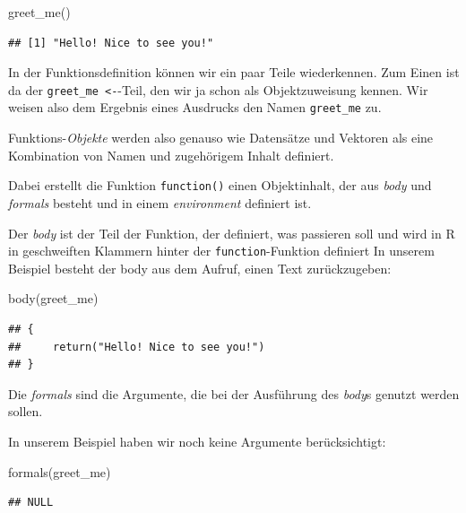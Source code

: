 \documentclass[
]{book}
\newenvironment{Shaded}{\begin{snugshade}}{\end{snugshade}}
\newcommand{\FunctionTok}[1]{\textcolor[rgb]{0.00,0.00,0.00}{#1}}
\newcommand{\NormalTok}[1]{#1}
\begin{document}
\begin{Shaded}
\begin{Highlighting}[]
\FunctionTok{greet\_me}\NormalTok{()}
\end{Highlighting}
\end{Shaded}

\begin{verbatim}
## [1] "Hello! Nice to see you!"
\end{verbatim}

In der Funktionsdefinition können wir ein paar Teile wiederkennen.
Zum Einen ist da der \texttt{greet\_me\ \textless{}-}-Teil, den wir ja schon als Objektzuweisung kennen. Wir weisen also dem Ergebnis eines Ausdrucks den Namen \texttt{greet\_me} zu.

Funktions-\emph{Objekte} werden also genauso wie Datensätze und Vektoren als eine Kombination von Namen und zugehörigem Inhalt definiert.

Dabei erstellt die Funktion \texttt{function()} einen Objektinhalt, der aus \emph{body} und \emph{formals} besteht und in einem \emph{environment} definiert ist.

Der \emph{body} ist der Teil der Funktion, der definiert, was passieren soll und wird in R in geschweiften Klammern hinter der \texttt{function}-Funktion definiert
In unserem Beispiel besteht der body aus dem Aufruf, einen Text zurückzugeben:

\begin{Shaded}
\begin{Highlighting}[]
\FunctionTok{body}\NormalTok{(greet\_me)}
\end{Highlighting}
\end{Shaded}

\begin{verbatim}
## {
##     return("Hello! Nice to see you!")
## }
\end{verbatim}

Die \emph{formals} sind die Argumente, die bei der Ausführung des \emph{body}s genutzt werden sollen.

In unserem Beispiel haben wir noch keine Argumente berücksichtigt:

\begin{Shaded}
\begin{Highlighting}[]
\FunctionTok{formals}\NormalTok{(greet\_me)}
\end{Highlighting}
\end{Shaded}

\begin{verbatim}
## NULL
\end{verbatim}
\end{document}

